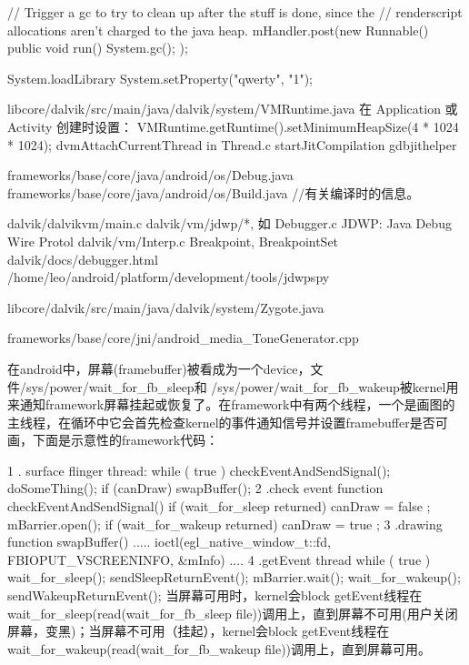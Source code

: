 \documentclass{book}
\begin{document}
\begin{CJK}{UTF8}{gbsn}
                // Trigger a gc to try to clean up after the stuff is done, since the
                // renderscript allocations aren't charged to the java heap.
                mHandler.post(new Runnable() {
                        public void run() {
                            System.gc();
                        }
                    });

System.loadLibrary
System.setProperty("qwerty", "1");

libcore/dalvik/src/main/java/dalvik/system/VMRuntime.java
在 Application 或 Activity 创建时设置：
      VMRuntime.getRuntime().setMinimumHeapSize(4 * 1024 * 1024);
dvmAttachCurrentThread in Thread.c
startJitCompilation
gdbjithelper

frameworks/base/core/java/android/os/Debug.java
frameworks/base/core/java/android/os/Build.java    //有关编译时的信息。

dalvik/dalvikvm/main.c
dalvik/vm/jdwp/*,   如 Debugger.c
JDWP: Java Debug Wire Protol
dalvik/vm/Interp.c    Breakpoint, BreakpointSet
dalvik/docs/debugger.html
/home/leo/android/platform/development/tools/jdwpspy

libcore/dalvik/src/main/java/dalvik/system/Zygote.java

frameworks/base/core/jni/android_media_ToneGenerator.cpp

在android中，屏幕(framebuffer)被看成为一个device，文件/sys/power/wait_for_fb_sleep和 /sys/power/wait_for_fb_wakeup被kernel用来通知framework屏幕挂起或恢复了。在framework中有两个线程，一个是画图的主线程，在循环中它会首先检查kernel的事件通知信号并设置framebuffer是否可画，下面是示意性的framework代码：

1 . surface flinger thread:    
while ( true ) {    
    checkEventAndSendSignal();    
    doSomeThing();    
     if  (canDraw) {    
        swapBuffer();    
    }    
}    
2 .check event function    
checkEventAndSendSignal() {    
     if  (wait_for_sleep  returned) {    
        canDraw =  false ;    
        mBarrier.open();    
    }    
     if  (wait_for_wakeup returned) {    
        canDraw =  true ;    
    }    
}    
3 .drawing function    
swapBuffer() {    
    .....    
    ioctl(egl_native_window_t::fd, FBIOPUT_VSCREENINFO, &mInfo)    
     ....    
}    
4 .getEvent thread    
while ( true ) {    
    wait_for_sleep();    
    sendSleepReturnEvent();    
    mBarrier.wait();    
   wait_for_wakeup();    
  sendWakeupReturnEvent();    
}   
当屏幕可用时，kernel会block getEvent线程在wait_for_sleep(read(wait_for_fb_sleep file))调用上，直到屏幕不可用(用户关闭屏幕，变黑)；当屏幕不可用（挂起），kernel会block getEvent线程在wait_for_wakeup(read(wait_for_fb_wakeup file))调用上，直到屏幕可用。


\end{CJK}
\end{document}
